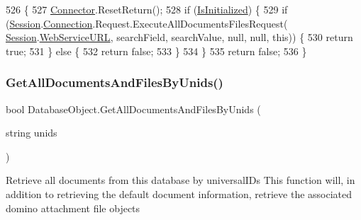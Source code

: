 \begin{DoxyCode}
526                                                                                      \{
527         \mbox{\hyperlink{class_connector}{Connector}}.ResetReturn();
528         \textcolor{keywordflow}{if} (\mbox{\hyperlink{class_database_object_a5fe036d32a30eb10d1b3f6a30263f740}{IsInitialized}}) \{
529             \textcolor{keywordflow}{if} (\mbox{\hyperlink{class_database_object_aa8484162b7d2a7c4c9426bca13c64c07}{Session}}.\mbox{\hyperlink{class_session_object_a014bdbf705a753540e19bfb53030c55c}{Connection}}.Request.ExecuteAllDocumentsFilesRequest(
      \mbox{\hyperlink{class_database_object_aa8484162b7d2a7c4c9426bca13c64c07}{Session}}.\mbox{\hyperlink{class_session_object_a697c071c812fbf7ad1166b896fb44c16}{WebServiceURL}}, searchField, searchValue, null, null, \textcolor{keyword}{this})) \{
530                 \textcolor{keywordflow}{return} \textcolor{keyword}{true};
531             \} \textcolor{keywordflow}{else} \{
532                 \textcolor{keywordflow}{return} \textcolor{keyword}{false};
533             \}
534         \}
535         \textcolor{keywordflow}{return} \textcolor{keyword}{false};
536     \}
\end{DoxyCode}
\mbox{\label{class_database_object_a9332713c924ab14195fe51bf0b8d35d1}} 
\subsubsection{\texorpdfstring{Get\+All\+Documents\+And\+Files\+By\+Unids()}{GetAllDocumentsAndFilesByUnids()}\hspace{0.1cm}{\footnotesize\ttfamily [1/2]}}
{\footnotesize\ttfamily bool Database\+Object.\+Get\+All\+Documents\+And\+Files\+By\+Unids (\begin{DoxyParamCaption}\item[{string}]{unids }\end{DoxyParamCaption})}



Retrieve all documents from this database by universal\+I\+Ds This function will, in addition to retrieving the default document information, retrieve the associated domino attachment file objects 

